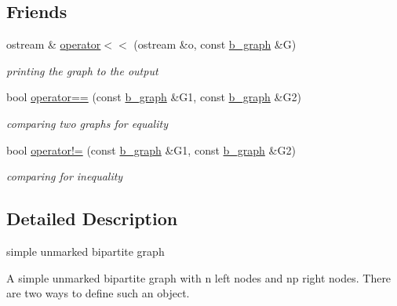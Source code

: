 \subsection*{Friends}
\begin{DoxyCompactItemize}
\item 
ostream \& \hyperlink{classb__graph_a0635d59bf5b2d1df3d3dd2beef14ac6e}{operator$<$$<$} (ostream \&o, const \hyperlink{classb__graph}{b\+\_\+graph} \&G)
\begin{DoxyCompactList}\small\item\em printing the graph to the output \end{DoxyCompactList}\item 
bool \hyperlink{classb__graph_adf87735e8372a81049b347b1fdd23484}{operator==} (const \hyperlink{classb__graph}{b\+\_\+graph} \&G1, const \hyperlink{classb__graph}{b\+\_\+graph} \&G2)
\begin{DoxyCompactList}\small\item\em comparing two graphs for equality \end{DoxyCompactList}\item 
bool \hyperlink{classb__graph_ab90cd92a2e8f077e4ae18c568bcddd1a}{operator!=} (const \hyperlink{classb__graph}{b\+\_\+graph} \&G1, const \hyperlink{classb__graph}{b\+\_\+graph} \&G2)
\begin{DoxyCompactList}\small\item\em comparing for inequality \end{DoxyCompactList}\end{DoxyCompactItemize}


\subsection{Detailed Description}
simple unmarked bipartite graph 

A simple unmarked bipartite graph with n left nodes and np right nodes. There are two ways to define such an object.


